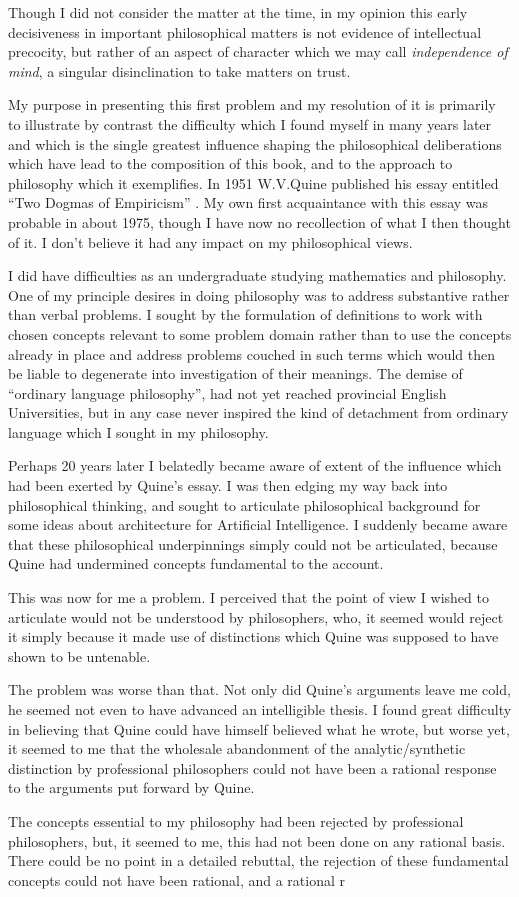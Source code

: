 Though I did not consider the matter at the time, in my opinion this early decisiveness in important philosophical matters is not evidence of intellectual precocity, but rather of an aspect of character which we may call {\it independence of mind}, a singular disinclination to take matters on trust.

My purpose in presenting this first problem and my resolution of it is primarily to illustrate by contrast the difficulty which I found myself in many years later and which is the single greatest influence shaping the philosophical deliberations which have lead to the composition of this book, and to the approach to philosophy which it exemplifies.
In 1951 W.V.Quine published his essay entitled ``Two Dogmas of Empiricism'' \cite{quine51}.
My own first acquaintance with this essay was probable in about 1975, though I have now no recollection of what I then thought of it.
I don't believe it had any impact on my philosophical views.

I did have difficulties as an undergraduate studying mathematics and philosophy.
One of my principle desires in doing philosophy was to address substantive rather than verbal problems.
I sought by the formulation of definitions to work with chosen concepts relevant to some problem domain rather than to use the concepts already in place and address problems couched in such terms which would then be liable to degenerate into investigation of their meanings.
The demise of ``ordinary language philosophy'', had not yet reached provincial English Universities, but in any case never inspired the kind of detachment from ordinary language which I sought in my philosophy.

Perhaps 20 years later I belatedly became aware of extent of the influence which had been exerted by Quine's essay.
I was then edging my way back into philosophical thinking, and sought to articulate philosophical background for some ideas about architecture for Artificial Intelligence.
I suddenly became aware that these philosophical underpinnings simply could not be articulated, because Quine had undermined concepts fundamental to the account.

This was now for me a problem.
I perceived that the point of view I wished to articulate would not be understood by philosophers, who, it seemed would reject it simply because it made use of distinctions which Quine was supposed to have shown to be untenable.

The problem was worse than that.
Not only did Quine's arguments leave me cold, he seemed not even to have advanced an intelligible thesis.
I found great difficulty in believing that Quine could have himself believed what he wrote, but worse yet, it seemed to me that the wholesale abandonment of the analytic/synthetic distinction by professional philosophers could not have been a rational response to the arguments put forward by Quine.

The concepts essential to my philosophy had been rejected by professional philosophers, but, it seemed to me, this had not been done on any rational basis.
There could be no point in a detailed rebuttal, the rejection of these fundamental concepts could not have been rational, and a rational r

